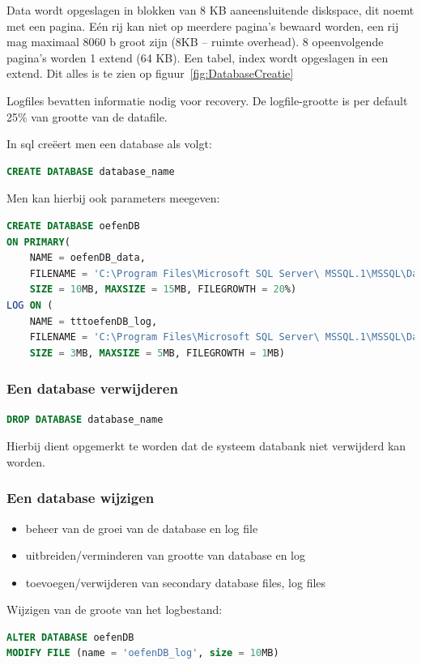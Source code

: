 \documentclass[a4paper,12pt]{article}
\begin{document}
Data wordt opgeslagen in blokken van 8 KB aaneensluitende diskspace, dit noemt met een pagina.
Eén rij kan niet op meerdere pagina’s bewaard worden, een rij mag maximaal 8060 b groot zijn (8KB – ruimte overhead).
8 opeenvolgende pagina’s worden 1 extend (64 KB).
Een tabel, index wordt opgeslagen in een extend.
Dit alles is te zien op figuur~\ref{fig:DatabaseCreatie}

Logfiles bevatten informatie nodig voor recovery.
De logfile-grootte is per default 25\% van grootte van de datafile.

In sql creëert men een database als volgt:
\begin{lstlisting}[language=sql]
CREATE DATABASE database_name
\end{lstlisting}

Men kan hierbij ook parameters meegeven:
\begin{lstlisting}[language=sql, breaklines=true]
CREATE DATABASE oefenDB 
ON PRIMARY(
	NAME = oefenDB_data,
	FILENAME = 'C:\Program Files\Microsoft SQL Server\ MSSQL.1\MSSQL\Data\oefenDB.mdf',
	SIZE = 10MB, MAXSIZE = 15MB, FILEGROWTH = 20%)
LOG ON (
	NAME = tttoefenDB_log,
	FILENAME = 'C:\Program Files\Microsoft SQL Server\ MSSQL.1\MSSQL\Data\oefenDB.ldf',
	SIZE = 3MB, MAXSIZE = 5MB, FILEGROWTH = 1MB)
\end{lstlisting}

\subsubsection{Een database verwijderen}
\begin{lstlisting}[language=sql, breaklines=true]
DROP DATABASE database_name
\end{lstlisting}

Hierbij dient opgemerkt te worden dat de systeem databank niet verwijderd kan worden.

\subsubsection{Een database wijzigen}
\begin{itemize}
\item beheer van de groei van de database en log file
\item uitbreiden/verminderen van grootte van database en log
\item toevoegen/verwijderen van secondary database files, log files
\end{itemize}

Wijzigen van de groote van het logbestand:
\begin{lstlisting}[language=sql, breaklines=true]
ALTER DATABASE oefenDB
MODIFY FILE (name = 'oefenDB_log', size = 10MB)
\end{lstlisting}
\end{document}
